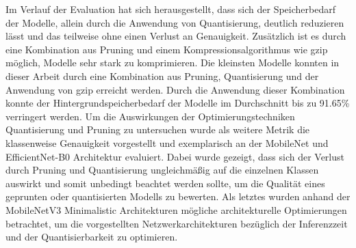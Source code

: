 Im Verlauf der Evaluation hat sich herausgestellt, dass sich der Speicherbedarf der Modelle, allein durch die Anwendung von Quantisierung, deutlich reduzieren lässt und das teilweise ohne einen Verlust an Genauigkeit. Zusätzlich ist es durch eine Kombination aus Pruning und einem Kompressionsalgorithmus wie gzip möglich, Modelle sehr stark zu komprimieren. Die kleinsten Modelle konnten in dieser Arbeit durch eine Kombination aus Pruning, Quantisierung und der Anwendung von gzip erreicht werden. Durch die Anwendung dieser Kombination konnte der Hintergrundspeicherbedarf der Modelle im Durchschnitt bis zu 91.65\% verringert werden. Um die Auswirkungen der Optimierungstechniken Quantisierung und Pruning zu untersuchen wurde als weitere Metrik die klassenweise Genauigkeit \cite{hooker_what_2020} vorgestellt und exemplarisch an der MobileNet und EfficientNet-B0 Architektur evaluiert. Dabei wurde gezeigt, dass sich der Verlust durch Pruning und Quantisierung ungleichmäßig auf die einzelnen Klassen auswirkt und somit unbedingt beachtet werden sollte, um die Qualität eines geprunten oder quantisierten Modells zu bewerten. Als letztes wurden anhand der MobileNetV3 Minimalistic Architekturen mögliche architekturelle Optimierungen betrachtet, um die vorgestellten Netzwerkarchitekturen bezüglich der Inferenzzeit und der Quantisierbarkeit zu optimieren.



\cleardoublepage
